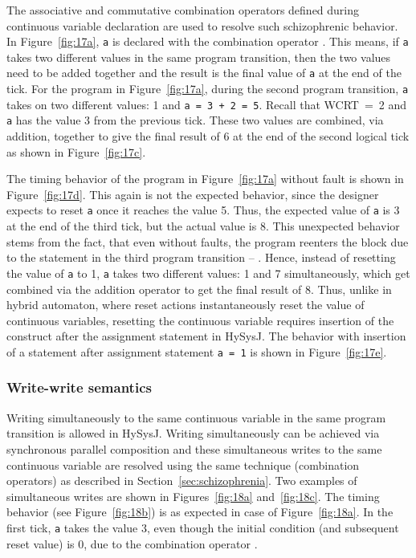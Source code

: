 \documentclass[10pt,journal,cspaper,compsoc]{IEEEtran}
\begin{document}
The associative and commutative combination operators defined during
continuous variable declaration are used to resolve such schizophrenic
behavior. In Figure~\ref{fig:17a}, \texttt{a} is declared with the
combination operator . This means, if \texttt{a} takes two
different values in the same program transition, then the two values
need to be added together and the result is the final value of
\texttt{a} at the end of the tick. For the program in
Figure~\ref{fig:17a}, during the second program transition, \texttt{a}
takes on two different values: 1 and \texttt{a = 3 + 2 = 5}. Recall that
\mbox{WCRT = 2} and \texttt{a} has the value 3 from the previous
tick. These two values are combined, via addition, together to give the
final result of 6 at the end of the second logical tick as shown in
Figure~\ref{fig:17c}.

The timing behavior of the program in Figure~\ref{fig:17a} without fault
is shown in Figure~\ref{fig:17d}. This again is not the expected
behavior, since the designer expects to reset \texttt{a} once it reaches
the value 5. Thus, the expected value of \texttt{a} is 3 at the end of
the third tick, but the actual value is 8. This unexpected behavior
stems from the fact, that even without faults, the program reenters the
  block due to the 
statement in the third program transition -- . Hence, instead of
resetting the value of \texttt{a} to 1, \texttt{a} takes two different
values: 1 and 7 simultaneously, which get combined via the addition
operator to get the final result of 8. Thus, unlike in hybrid automaton,
where reset actions instantaneously reset the value of continuous
variables, resetting the continuous variable requires insertion of the
 construct after the assignment statement in HySysJ. The
behavior with insertion of a  statement after assignment
statement \texttt{a = 1} is shown in Figure~\ref{fig:17e}.

\subsubsection{Write-write semantics}
\label{sec:write-write-semant-2}

Writing simultaneously to the same continuous variable in the same
program transition is allowed in HySysJ. Writing simultaneously can be
achieved via synchronous parallel composition and these simultaneous
writes to the same continuous variable are resolved using the same
technique (combination operators) as described in
Section~\ref{sec:schizophrenia}. Two examples of simultaneous writes are
shown in Figures~\ref{fig:18a} and~\ref{fig:18c}. The timing behavior
(see Figure~\ref{fig:18b}) is as expected in case of
Figure~\ref{fig:18a}. In the first tick, \texttt{a} takes the value 3,
even though the initial condition (and subsequent reset value) is 0, due
to the combination operator . 
\end{document}
